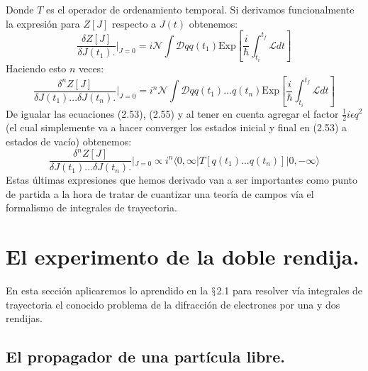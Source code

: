 Donde $T$ es el operador de ordenamiento temporal. Si derivamos funcionalmente la expresión para $Z[J]$ respecto a $J(t)$ obtenemos:
\begin{equation}
\frac{\delta Z[J]}{\delta J(t_{1}).}|_{J=0}=i\mathcal{N}\int\mathcal{D}qq(t_{1})\text{Exp}\left[\frac{i}{\hbar}\int_{t_{i}}^{t_{f}}\mathcal{L}dt\right]
\end{equation}	
Haciendo esto $n$ veces:
\begin{equation}
\frac{\delta^{n}Z[J]}{\delta J(t_{1})...\delta J(t_{n}).}|_{J=0}=i^{n}\mathcal{N}\int\mathcal{D}qq(t_{1})...q(t_{n})\text{Exp}\left[\frac{i}{\hbar}\int_{t_{i}}^{t_{f}}\mathcal{L}dt\right]
\end{equation}
De igualar las ecuaciones (2.53), (2.55) y al tener en cuenta agregar el factor $\frac{1}{2}i\epsilon q^2$ (el cual simplemente va a hacer converger los estados inicial y final en (2.53) a estados de vacío) obtenemos:
\begin{equation}
\frac{\delta^{n}Z[J]}{\delta J(t_{1})...\delta J(t_{n}).}|_{J=0}\propto i^{n}\langle0,\infty|T[q(t_{1})...q(t_{n})]|0,-\infty\rangle
\end{equation}
Estas últimas expresiones que hemos derivado van a ser importantes como punto de partida a la hora de tratar de cuantizar una teoría de campos vía el formalismo de integrales de trayectoria.
\newpage


\section{El experimento de la doble rendija.}
En esta sección aplicaremos lo aprendido en la $\mathsection$2.1 para resolver vía integrales de trayectoria el conocido problema de la difracción de electrones por una y dos rendijas. 

\subsection{El propagador de una partícula libre.}

